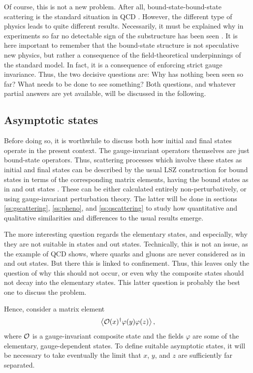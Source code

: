\documentclass[final,twoside,12pt]{article}
\newcommand*{\no}{\noindent}
\newcommand*{\be}{\begin{equation}}
\newcommand*{\ee}{\end{equation}}
\newcommand*{\1}{1\!\!\!\bot}
\newcommand*{\la}{\left\langle}
\newcommand*{\ra}{\right\rangle}
\newcommand*{\op}{{\cal O}}
\begin{document}
Of course, this is not a new problem. After all, bound-state-bound-state scattering is the standard situation in QCD \cite{BeiglboCk:2006lfa,Bohm:2001yx,Dissertori:2003pj}. However, the different type of physics leads to quite different results. Necessarily, it must be explained why in experiments so far no detectable sign of the substructure has been seen \cite{pdg}. It is here important to remember that the bound-state structure is not speculative new physics, but rather a consequence of the field-theoretical underpinnings of the standard model. In fact, it is a consequence of enforcing strict gauge invariance. Thus, the two decisive questions are: Why has nothing been seen so far? What needs to be done to see something? Both questions, and whatever partial answers are yet available, will be discussed in the following.

\subsection{Asymptotic states}\label{ss:asymp}

Before doing so, it is worthwhile to discuss both how initial and final states operate in the present context. The gauge-invariant operators themselves are just bound-state operators. Thus, scattering processes which involve these states as initial and final states can be described by the usual LSZ construction for bound states in terms of the corresponding matrix elements, having the bound states as in and out states \cite{Alkofer:2000wg,Bohm:2001yx}. These can be either calculated entirely non-perturbatively, or using gauge-invariant perturbation theory. The latter will be done in sections \ref{ss:gscattering}, \ref{ss:pheno}, and \ref{ss:qscattering} to study how quantitative and qualitative similarities and differences to the usual results emerge.

The more interesting question regards the elementary states, and especially, why they are not suitable in states and out states. Technically, this is not an issue, as the example of QCD shows, where quarks and gluons are never considered as in and out states. But there this is linked to confinement. Thus, this leaves only the question of why this should not occur, or even why the composite states should not decay into the elementary states. This latter question is probably the best one to discuss the problem.

Hence, consider a matrix element
\be
\la \op(x)^\dagger\varphi(y)\varphi(z)\ra\label{decay},
\ee
\no where $\op$ is a gauge-invariant composite state and the fields $\varphi$ are some of the elementary, gauge-dependent states. To define suitable asymptotic states, it will be necessary to take eventually the limit that $x$, $y$, and $z$ are sufficiently far separated.
\end{document}
